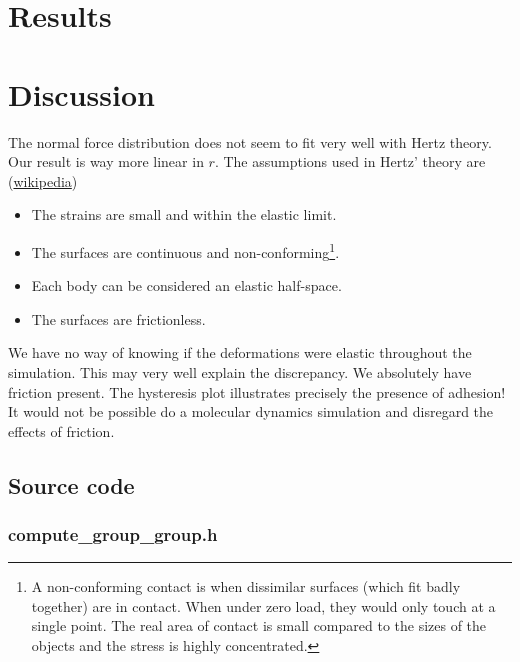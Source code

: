 \documentclass[twoside,english]{uiofysmaster}
\begin{document}
\part{Results}







\part{Discussion}

The normal force distribution does not seem to fit very well with Hertz theory.
Our result is way more linear in $r$. 
The assumptions used in Hertz' theory are (\href{https://en.wikipedia.org/wiki/Contact_mechanics}{wikipedia})
\begin{itemize}
	\item The strains are small and within the elastic limit.
	\item The surfaces are continuous and non-conforming\footnote{
A non-conforming contact is when dissimilar surfaces (which fit badly together) are in contact. When under zero load, they would only touch at a single point. 
The real area of contact is small compared to the sizes of the objects and the stress is highly concentrated.}.
	\item Each body can be considered an elastic half-space.
	\item The surfaces are frictionless.
\end{itemize}

We have no way of knowing if the deformations were elastic throughout the simulation.
This may very well explain the discrepancy.
We absolutely have friction present.
The hysteresis plot illustrates precisely  the presence of adhesion! 
It would not be possible do a molecular dynamics simulation and disregard the effects of friction.
 



\appendix
\chapter{Source code}

\newpage
\section{compute\_group\_group.h}
\label{groupgrouph}

\end{document}

